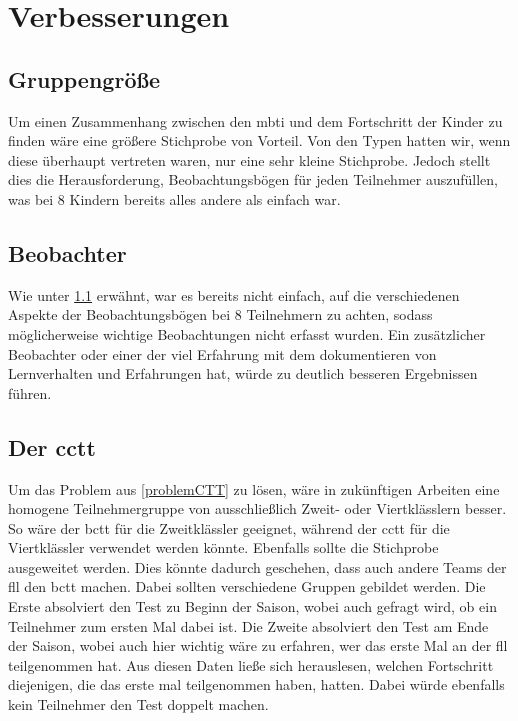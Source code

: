  

\section{Verbesserungen}
\subsection{Gruppengröße}\label{size}
Um einen Zusammenhang zwischen den \acrlong{mbti} und dem Fortschritt der Kinder zu finden wäre eine größere Stichprobe von Vorteil. Von den Typen hatten wir, wenn diese überhaupt vertreten waren, nur eine sehr kleine Stichprobe. Jedoch stellt dies die Herausforderung, Beobachtungsbögen für jeden Teilnehmer auszufüllen, was bei 8 Kindern bereits alles andere als einfach war.

\subsection{Beobachter}
Wie unter \ref{size} erwähnt, war es bereits nicht einfach, auf die verschiedenen Aspekte der Beobachtungsbögen bei 8 Teilnehmern zu achten, sodass möglicherweise wichtige Beobachtungen nicht erfasst wurden. Ein zusätzlicher Beobachter oder einer der viel Erfahrung mit dem dokumentieren von Lernverhalten und Erfahrungen hat, würde zu deutlich besseren Ergebnissen führen.

\subsection{Der \acrlong{cctt}}
Um das Problem aus \ref{problemCTT} zu lösen, wäre in zukünftigen Arbeiten eine homogene Teilnehmergruppe von ausschließlich Zweit- oder Viertklässlern besser.\\
So wäre der \acrshort{bctt} für die Zweitklässler geeignet, während der \acrshort{cctt} für die Viertklässler verwendet werden könnte.
Ebenfalls sollte die Stichprobe ausgeweitet werden. Dies könnte dadurch geschehen, dass auch andere Teams der \acrshort{fll} den \acrshort{bctt} machen. Dabei sollten verschiedene Gruppen gebildet werden. Die Erste absolviert den Test zu Beginn der Saison, wobei auch gefragt wird, ob ein Teilnehmer zum ersten Mal dabei ist. Die Zweite absolviert den Test am Ende der Saison, wobei auch hier wichtig wäre zu erfahren, wer das erste Mal an der \acrshort{fll} teilgenommen hat. Aus diesen Daten ließe sich herauslesen, welchen Fortschritt diejenigen, die das erste mal teilgenommen haben, hatten. Dabei würde ebenfalls kein Teilnehmer den Test doppelt machen.



